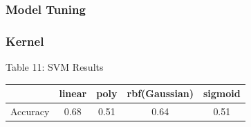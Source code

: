 \documentclass{article}
\begin{document}
\subsubsection*{Model Tuning}
\subsubsection*{Kernel}

\begin{table}
	
	\centering
	Table 11: SVM Results \\
	\begin{tabular}{ l c c c c }
		\hline
		& linear & poly & rbf(Gaussian) & sigmoid\\
		\hline
		Accuracy & 0.68 & 0.51 & 0.64 & 0.51 \\
		\hline 
	\end{tabular}
\end{table}
\end{document}
